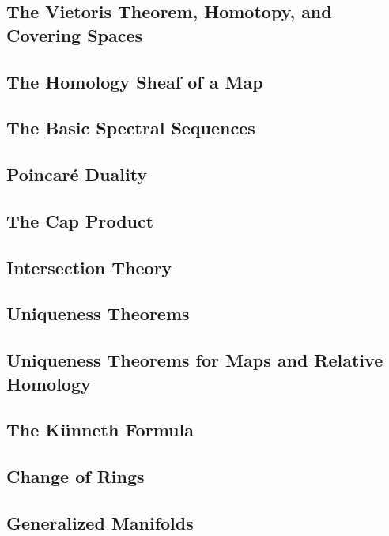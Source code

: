 \documentclass[11pt, a4paper]{article}
\begin{document}
\subsection{The Vietoris Theorem, Homotopy, and Covering Spaces}

\subsection{The Homology Sheaf of a Map}

\subsection{The Basic Spectral Sequences}

\subsection{Poincar\'e Duality}

\subsection{The Cap Product}

\subsection{Intersection Theory}

\subsection{Uniqueness Theorems}

\subsection{Uniqueness Theorems for Maps and Relative Homology}

\subsection{The K\"unneth Formula}

\subsection{Change of Rings}

\subsection{Generalized Manifolds}
\end{document}
